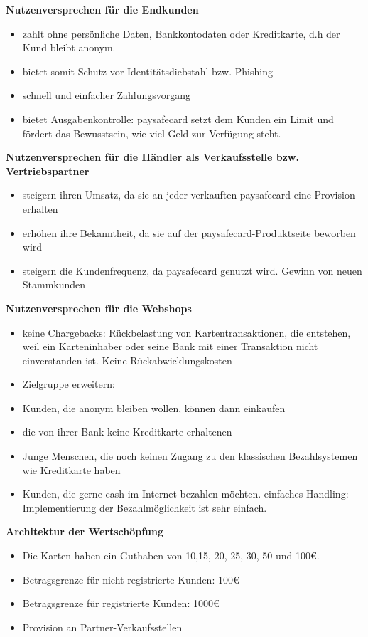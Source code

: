 \textbf{Nutzenversprechen für die Endkunden}
\begin{itemize}
        \item zahlt ohne persönliche Daten, Bankkontodaten oder Kreditkarte, d.h der Kund bleibt anonym.
        \item bietet somit Schutz vor Identitätsdiebstahl bzw. Phishing
        \item schnell und einfacher Zahlungsvorgang
        \item bietet Ausgabenkontrolle: paysafecard setzt dem Kunden ein Limit und fördert das Bewusstsein, wie viel Geld zur Verfügung steht.
\end{itemize}


\textbf{Nutzenversprechen für die Händler als Verkaufsstelle bzw. Vertriebspartner}
\begin{itemize}
        \item steigern ihren Umsatz, da sie an jeder verkauften paysafecard eine Provision erhalten
        \item erhöhen ihre Bekanntheit, da sie auf der paysafecard-Produktseite beworben wird
        \item steigern die Kundenfrequenz, da paysafecard genutzt wird. Gewinn von neuen Stammkunden
\end{itemize}

\textbf{Nutzenversprechen für die Webshops}
\begin{itemize}
        \item keine Chargebacks: Rückbelastung von Kartentransaktionen, die entstehen, weil ein Karteninhaber oder seine Bank mit einer Transaktion nicht einverstanden ist. Keine Rückabwicklungskosten
        \item Zielgruppe erweitern:
        \item   Kunden, die anonym bleiben wollen, können dann einkaufen
        \item   die von ihrer Bank keine Kreditkarte erhaltenen
        \item   Junge Menschen, die noch keinen Zugang zu den klassischen Bezahlsystemen wie Kreditkarte haben
        \item   Kunden, die gerne cash im Internet bezahlen möchten.
einfaches Handling: Implementierung der Bezahlmöglichkeit ist sehr einfach.
\end{itemize}

\textbf{Architektur der Wertschöpfung}
\begin{itemize}
        \item Die Karten haben ein Guthaben von 10,15, 20, 25, 30, 50 und 100\euro{}.
        \item Betragsgrenze für nicht registrierte Kunden: 100\euro{}
        \item Betragsgrenze für registrierte Kunden: 1000\euro{}
        \item Provision an Partner-Verkaufsstellen
\end{itemize}


